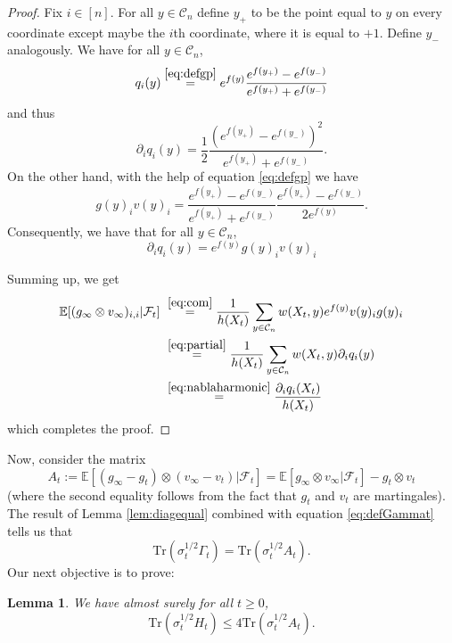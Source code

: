 \documentclass[12pt]{article}
\def \EE {\mathbb E}
\def \FF {\mathcal{F}}
\def \tr {\mathrm{Tr}}
\def \DC {\mathcal{C}_n}
\newtheorem{lemma}[theorem]{Lemma}
\theoremstyle{definition}
\theoremstyle{remark}
\begin{document}
\begin{proof}
	Fix $i \in [n]$. For all $y \in \DC$ define $y_+$ to be the point equal to $y$ on every coordinate except maybe the $i$th coordinate, where it is equal to $+1$. Define $y_-$ analogously. We have for all $y \in \DC$,
	$$
	q_i(y) \stackrel{\eqref{eq:defgp} }{=}  e^{f(y)} \frac{e^{f(y_+)} - e^{f(y_-) } }{ e^{f(y_+)} + e^{f(y_-)}}
	$$
	and thus	
	$$
	\partial_i q_i(y) = \frac{1}{2} \frac{ \left (e^{f(y_+)} - e^{f(y_-) } \right )^2 }{ e^{f(y_+)} + e^{f(y_-)}}. 
	$$
	On the other hand, with the help of equation \eqref{eq:defgp} we have
	$$
	g(y)_i v(y)_i = \frac{e^{f(y_+)} - e^{f(y_-) } }{ e^{f(y_+)} + e^{f(y_-)}} \frac{e^{f(y_+)} - e^{f(y_-) }}{ 2 e^{f(y)} }.
	$$
	Consequently, we have that for all $y \in \DC$,
	\begin{equation} \label{eq:partial}
	\partial_i q_i(y) = e^{f(y)} g(y)_i v(y)_i
	\end{equation}
	
	Summing up, we get
	\begin{align*}
	\EE[(g_\infty \otimes v_\infty)_{i,i} | \FF_t ] ~& \stackrel{\eqref{eq:com}}{=} \frac{1}{h(X_t)} \sum_{y \in \DC} w(X_t,y) e^{f(y)} v(y)_i g(y)_i \\
	& \stackrel{\eqref{eq:partial}}{=} \frac{1}{h(X_t)} \sum_{y \in \DC} w(X_t,y) \partial_i q_i(y) \\
	& \stackrel{\eqref{eq:nablaharmonic}}{=} \frac{\partial_i q_i(X_t)}{h(X_t)}
	\end{align*}
	which completes the proof.	
\end{proof}

Now, consider the matrix
\begin{equation}
A_t := \EE[ (g_\infty - g_t) \otimes (v_\infty - v_t) | \FF_t ] = \EE[g_\infty \otimes v_\infty | \FF_t] - g_t \otimes v_t
\end{equation}
(where the second equality follows from the fact that $g_t$ and $v_t$ are martingales). The result of Lemma \ref{lem:diagequal} combined with equation \eqref{eq:defGammat} tells us that
\begin{equation}\label{eq:equaltraces}
\tr(\sigma_t^{1/2} \Gamma_t) = \tr(\sigma_t^{1/2} A_t).
\end{equation}
Our next objective is to prove:
\begin{lemma} \label{lem:HtAt}
We have almost surely for all $t \geq 0$,
\begin{equation}\label{eq:vtgt}
\tr(\sigma_t^{1/2} H_t) \leq 4 \tr( \sigma_t^{1/2} A_t  ).
\end{equation}
\end{lemma}
\end{document}
